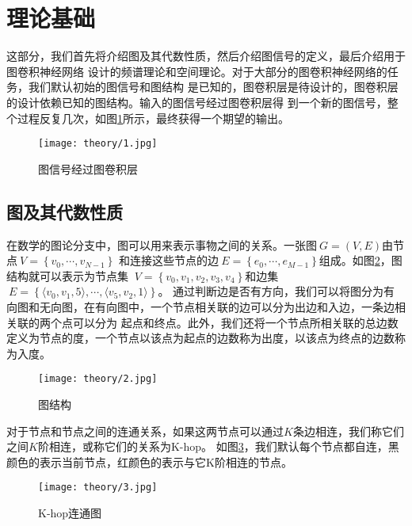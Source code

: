 \cleardoublepage

\section{理论基础}
这部分，我们首先将介绍图及其代数性质，然后介绍图信号的定义，最后介绍用于图卷积神经网络
设计的频谱理论和空间理论。对于大部分的图卷积神经网络的任务，我们默认初始的图信号和图结构
是已知的，图卷积层是待设计的，图卷积层的设计依赖已知的图结构。输入的图信号经过图卷积层得
到一个新的图信号，整个过程反复几次，如图\ref{2-1}所示，最终获得一个期望的输出。
\begin{figure}[ht]
    \centering
    \texttt{[image: theory/1.jpg]}
    \caption{\label{2-1}图信号经过图卷积层}
\end{figure}

\subsection{图及其代数性质}
在数学的图论分支中，图可以用来表示事物之间的关系。一张图$\ G = (V , E) $由节点$\ V = \left \{ v_{0},\cdots,v_{N-1} \right \} $
和连接这些节点的边$\ E = \left \{ e_{0}, \cdots ,e_{M-1} \right \} $组成。如图\ref{2-2}，图结构就可以表示为节点集
$\ V = \left \{ v_{0}, v_{1},v_{2},v_{3},v_{4} \right \} $和边集$\ E = \left \{ \langle v_0,v_1,5 \rangle , \cdots, \langle v_5,v_2,1 \rangle \right \} $。
通过判断边是否有方向，我们可以将图分为有向图和无向图，在有向图中，一个节点相关联的边可以分为出边和入边，一条边相关联的两个点可以分为
起点和终点。此外，我们还将一个节点所相关联的总边数定义为节点的度，一个节点以该点为起点的边数称为出度，以该点为终点的边数称为入度。
\begin{figure}[ht]
    \centering
    \texttt{[image: theory/2.jpg]}
    \caption{\label{2-2}图结构}
\end{figure}

对于节点和节点之间的连通关系，如果这两节点可以通过$K$条边相连，我们称它们之间$K$阶相连，或称它们的关系为K-hop。
如图\ref{2-3}，我们默认每个节点都自连，黑颜色的表示当前节点，红颜色的表示与它K阶相连的节点。
\begin{figure}[ht]
    \centering
    \texttt{[image: theory/3.jpg]}
    \caption{\label{2-3}K-hop连通图}
\end{figure}

